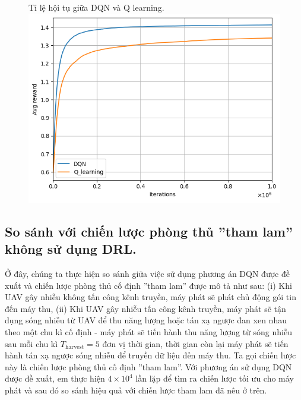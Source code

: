 \documentclass{uetgraduation}
\begin{document}
\begin{figure}{Tỉ lệ hội tụ giữa DQN và Q learning.}
    \centering
    \includegraphics[scale=0.5]{converged}
    \label{fig:converged}
\end{figure}

\subsection{So sánh với chiến lược phòng thủ ''tham lam'' không sử dụng DRL.}
Ở đây, chúng ta thực hiện so sánh giữa việc sử dụng phương án DQN được đề xuất và chiến lược phòng thủ cố định ''tham lam'' được mô tả như sau: (i) Khi
UAV gây nhiễu không tấn công kênh truyền, máy phát sẽ phát chủ động gói tin đến máy thu, (ii) Khi UAV gây nhiễu tấn công kênh truyền, máy phát sẽ tận dụng
sóng nhiễu từ UAV để thu năng lượng hoặc tán xạ ngược đan xen nhau theo một chu kì cố định - máy phát sẽ tiến hành thu năng lượng từ sóng nhiễu sau mỗi chu kì
$T_\text{harvest} = 5$ đơn vị thời gian, thời gian còn lại máy phát sẽ tiến hành tán xạ ngược sóng nhiễu để truyền dữ liệu đến máy thu. Ta gọi chiến lược này
là chiến lược phòng thủ cố định ''tham lam''. Với phương án sử dụng DQN được đề xuất, em thực hiện $4 \times 10^4$ lần lặp để tìm ra chiến lược tối ưu cho máy
phát và sau đó so sánh hiệu quả với chiến lược tham lam đã nêu ở trên.
\end{document}

